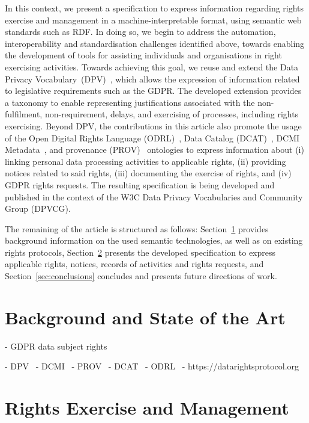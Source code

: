 \documentclass{IOS-Book-Article}     %
\begin{document}
In this context, we present a specification to express information regarding rights exercise and management in a machine-interpretable format, using semantic web standards such as RDF.
In doing so, we begin to address the automation, interoperability and standardisation challenges identified above, towards enabling the development of tools for assisting individuals and organisations in right exercising activities. 
Towards achieving this goal, we reuse and extend the Data Privacy Vocabulary~(DPV)~\cite{pandit2024dpv}, which allows the expression of information related to legislative requirements such as the GDPR.
The developed extension provides a taxonomy to enable representing justifications associated with the non-fulfilment, non-requirement, delays, and exercising of processes, including rights exercising.
Beyond DPV, the contributions in this article also promote the usage of the Open Digital Rights Language (ODRL)~\cite{iannella_odrl_2018}, Data Catalog (DCAT)~\cite{albertoni_dcat_2024}, DCMI Metadata~\cite{dcmi_2020}, and provenance (PROV)~\cite{lebo_prov_2013} ontologies to express information about 
(i) linking personal data processing activities to applicable rights,
(ii) providing notices related to said rights,
(iii) documenting the exercise of rights, and
(iv) GDPR rights requests.
The resulting specification is being developed and published in the context of the W3C Data Privacy Vocabularies and Community Group (DPVCG).

The remaining of the article is structured as follows: Section~\ref{sec:sota} provides background information on the used semantic technologies, as well as on existing rights protocols, Section~\ref{sec:rights} presents the developed specification to express applicable rights, notices, records of activities and rights requests, and Section~\ref{sec:conclusions} concludes and presents future directions of work.

\section{Background and State of the Art}
\label{sec:sota}

- GDPR data subject rights

- DPV~\cite{pandit2024dpv}
- DCMI~\cite{dcmi_2020}
- PROV~\cite{lebo_prov_2013}
- DCAT~\cite{albertoni_dcat_2024}
- ODRL~\cite{iannella_odrl_2018}
- https://datarightsprotocol.org

\section{Rights Exercise and Management}
\label{sec:rights}
\end{document}
